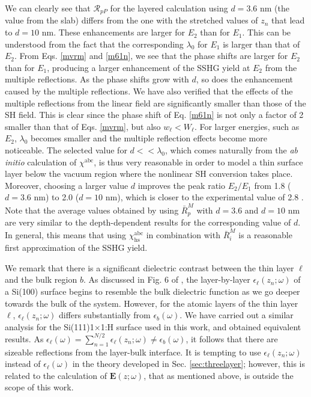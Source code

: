 \documentclass[utf8]{frontiersSCNS}
\begin{document}
We can clearly see that $\mathcal{R}_{pP}$ for the layered calculation using $d
= 3.6$ nm (the value from the slab) differs from the one with the stretched
values of $z_{n}$ that lead to $d = 10$ nm. These enhancements are larger for
$E_{2}$ than for $E_{1}$. This can be understood from the fact that the
corresponding $\lambda_{0}$ for $E_{1}$ is larger than that of $E_{2}$. From
Eqs. \eqref{mvrm} and \eqref{m61n}, we see that the phase shifts are larger for
$E_{2}$ than for $E_{1}$, producing a larger enhancement of the SSHG yield at
$E_{2}$ from the multiple reflections. As the phase shifts grow with $d$, so
does the enhancement caused by the multiple reflections. We have also verified
that the effects of the multiple reflections from the linear field are
significantly smaller than those of the SH field. This is clear since the phase
shift of Eq. \eqref{m61n} is not only a factor of 2 smaller than that of Eqs.
\eqref{mvrm}, but also $w_{\ell} < W_{\ell}$. For larger energies, such as
$E_{2}$, $\lambda_{0}$ becomes smaller and the multiple reflection effects
become more noticeable. The selected value for $d << \lambda_{0}$, which comes
naturally from the \emph{ab initio} calculation of $\chi^{\mathrm{abc}}$, is
thus very reasonable in order to model a thin surface layer below the vacuum
region where the nonlinear SH conversion takes place. Moreover, choosing a
larger value $d$ improves the peak ratio $E_{2}/E_{1}$ from 1.8 ($d=3.6$ nm) to
2.0 ($d=10$ nm), which is closer to the experimental value of 2.8
\citep{andersonPRB16b}.
{\color{red}%
Note that the average values obtained by using $\bar{R}^{M}_{p}$ with $d = 3.6$
and $d = 10$ nm are very similar to the depth-dependent results for the
corresponding value of $d$. In general, this means that using
$\chi^{\mathrm{abc}}_{\mathrm{hs}}$ in combination with $\bar{R}^{M}_{i}$ is a
reasonable first approximation of the SSHG yield.
}

{\color{red}
We remark that there is a significant dielectric contrast between the thin layer
$\ell$ and the bulk region $b$. As discussed in Fig. 6 of \cite{mendozaPRB06},
the layer-by-layer $\epsilon_{\ell}(z_{n};\omega)$ of a Si(100) surface begins
to resemble the bulk dielectric function as we go deeper towards the bulk of the
system. However, for the atomic layers of the thin layer $\ell$,
$\epsilon_{\ell}(z_{n};\omega)$ differs substantially from
$\epsilon_{b}(\omega)$. We have carried out a similar analysis for the
Si(111)1$\times$1:H surface used in this work, and obtained equivalent results.
As $\epsilon_{\ell}(\omega)=\sum_{n=1}^{N/2}\epsilon_{\ell}(z_{n};\omega)\neq
\epsilon_{b}(\omega)$, it follows that there are sizeable reflections from the
layer-bulk interface. It is tempting to use $\epsilon_{\ell}(z_{n};\omega)$
instead of $\epsilon_{\ell}(\omega)$ in the theory developed in Sec.
\ref{sec:threelayer}; however, this is related to the calculation of
$\mathbf{E}(z;\omega)$, that as mentioned above, is outside the scope of this
work.
}
\end{document}
